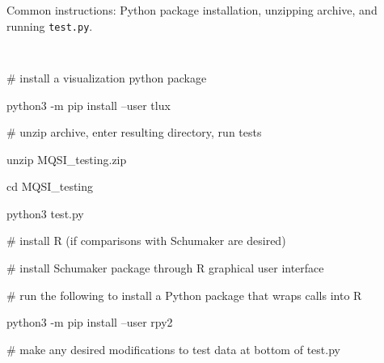 \vskip 5mm

Common instructions: Python package installation, unzipping archive, and running {\hskip 1mm} {\tt test.py}.

{\parskip=2pt \parindent=20pt \tt
\item{} \textMaroon \# install a visualization python package \textBlack
\item{} python3 -m pip install --user tlux
\item{}
\item{} \textMaroon \# unzip archive, enter resulting directory, run tests \textBlack
\item{} unzip MQSI\_testing.zip
\item{} cd MQSI\_testing
\item{} python3 test.py
\item{}
\item{} \textMaroon \# install R (if comparisons with Schumaker are desired) \textBlack
\item{} \textMaroon \# install Schumaker package through R graphical user interface \textBlack
\item{} \textMaroon \# run the following to install a Python package that wraps calls into R \textBlack
\item{} python3 -m pip install --user rpy2
\item{}
\item{} \textMaroon \# make any desired modifications to test data at bottom of \textBlack test.py 
}

\bye


